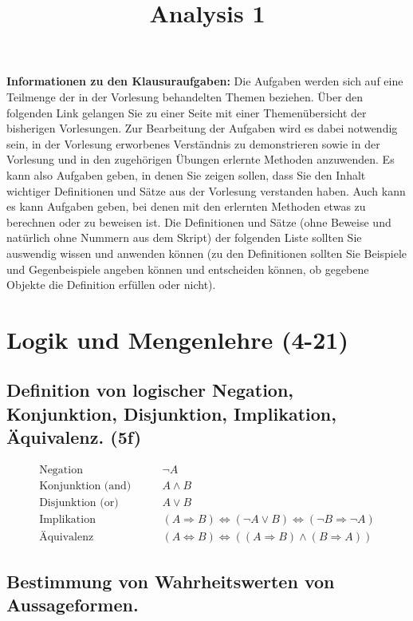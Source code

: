 \documentclass[10pt,a4paper]{article}
\title{Analysis 1}
\begin{document}
\maketitle

\textbf{Informationen zu den Klausuraufgaben:} Die Aufgaben werden sich auf eine Teilmenge der in der Vorlesung behandelten Themen beziehen. Über den folgenden Link gelangen Sie zu einer Seite mit einer 
Themenübersicht der bisherigen Vorlesungen. 
Zur Bearbeitung der Aufgaben wird es dabei notwendig sein, in der Vorlesung erworbenes Verständnis zu demonstrieren sowie in der Vorlesung und in den zugehörigen Übungen erlernte Methoden anzuwenden. Es kann also Aufgaben geben, in denen Sie zeigen sollen, dass Sie den Inhalt wichtiger Definitionen und Sätze aus der Vorlesung verstanden haben. Auch kann es kann Aufgaben geben, bei denen mit den erlernten Methoden etwas zu berechnen oder zu beweisen ist. Die Definitionen und Sätze (ohne Beweise und natürlich ohne Nummern aus dem Skript) der folgenden Liste sollten Sie auswendig wissen und anwenden können (zu den Definitionen sollten Sie Beispiele und Gegenbeispiele angeben können und entscheiden können, ob gegebene Objekte die Definition erfüllen oder nicht). 

\section{Logik und Mengenlehre (4-21)}

\subsection{Definition von logischer Negation, Konjunktion, Disjunktion, Implikation, Äquivalenz. (5f)}
\begin{equation}
\begin{split}
\text{Negation} \qquad & \neg A \\
\text{Konjunktion (and)}  \qquad & A \wedge B \\
\text{Disjunktion (or)}  \qquad & A \vee B \\
\text{Implikation}  \qquad & (A \Rightarrow B) \Leftrightarrow (\neg A \vee B) \Leftrightarrow (\neg B \Rightarrow \neg A) \\
\text{Äquivalenz}  \qquad & (A \Leftrightarrow B) \Leftrightarrow ((A \Rightarrow B) \wedge (B \Rightarrow A))
\end{split}
\end{equation}

\subsection{Bestimmung von Wahrheitswerten von Aussageformen.}
\end{document}
